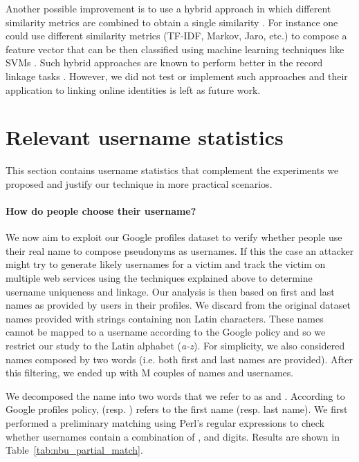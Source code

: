 \documentclass[letterpaper]{sig-alternate}
\begin{document}
Another possible improvement is to use a hybrid approach in which different
similarity metrics are combined to obtain a single similarity
\cite{rl_comparison}. For instance one could use different similarity metrics (TF-IDF, Markov, Jaro, etc.)
to compose a feature vector that can be then classified using machine learning
techniques like SVMs \cite{svm}. Such hybrid approaches are known to perform
better in the record linkage tasks \cite{rl_comparison}.
However, we did not test or implement such approaches and their application
to linking online identities is left as future work.




\section{Relevant username statistics}
\label{stats}

This section contains username statistics that complement the experiments
we proposed and justify our technique in more practical scenarios.




\paragraph {How do people choose their username?}

We now aim to exploit our Google profiles dataset to verify
whether people use their real name to compose pseudonyms as usernames.  If this
the case an attacker might try to generate likely usernames for a victim and
track the victim on multiple web services using the techniques explained above
to determine username uniqueness and linkage.  Our analysis is then based on
first and last names as provided by users in their profiles. We discard from
the original dataset names provided with strings containing non Latin
characters. These names cannot be mapped to a username according to the Google
policy and so we restrict our study to the Latin alphabet (\emph{a-z}).  For
simplicity, we also considered names composed by two words (i.e. both first
and last names are provided). After this filtering, we ended up with M couples of
names and usernames.










We decomposed the name into two words that we refer
to as  and . According to Google profiles policy,  (resp. )
refers to the first name (resp. last name).  We first performed a preliminary
matching using Perl's regular expressions to check whether usernames contain a
combination of ,  and digits. Results are shown in
Table~\ref{tab:nbu_partial_match}. 
\end{document}
